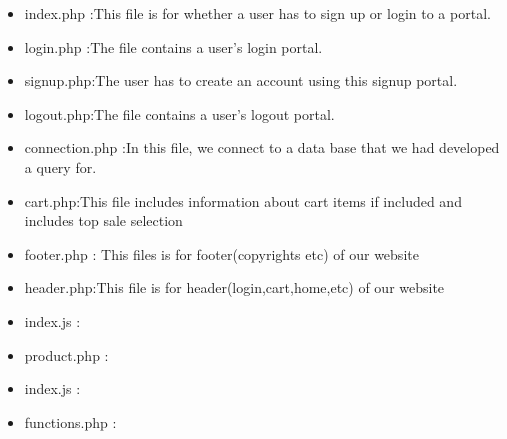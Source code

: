 \documentclass[12pt]{article}
\begin{document}
\begin{itemize}
\item index.php :This file is for whether a user has to sign up or login to a portal.
\item login.php :The file contains a user's login portal.
\item signup.php:The user has to create an account using this signup portal.
\item logout.php:The file contains a user's logout portal.
\item connection.php :In this file, we connect to a data base that we had developed a query for.
\item cart.php:This file includes  information about cart items if included and includes top sale selection
\item footer.php : This files is for footer(copyrights etc) of our website
\item header.php:This file is for header(login,cart,home,etc) of our website
\item index.js :
\item product.php :
\item index.js :
\item functions.php :
\end{itemize}
\end{document}
